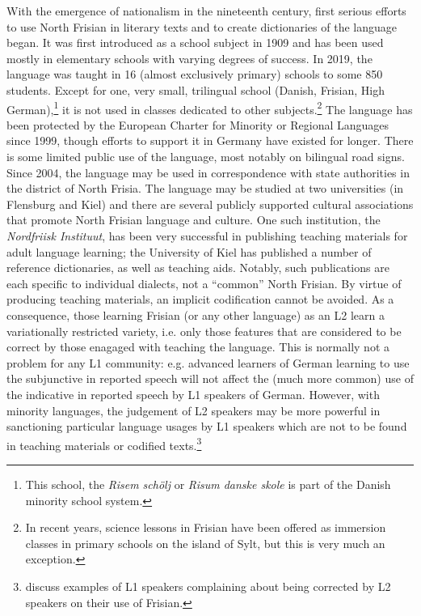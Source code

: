 \documentclass[output=paper]{langsci/langscibook}
\begin{document}
With the emergence of nationalism in the nineteenth century, first serious efforts to use North Frisian in literary texts and to create dictionaries of the language began. It was first introduced as a school subject in 1909 and has been used mostly in elementary schools with varying degrees of success. In 2019, the language was taught in 16 (almost exclusively primary) schools to some 850 students. Except for one, very small, trilingual school (Danish, Frisian, High German),\footnote{This school, the \textit{Risem schölj} or \textit{Risum danske skole} is part of the Danish minority school system.} it is not used in classes dedicated to other subjects.\footnote{In recent years, science lessons in Frisian have been offered as immersion classes in primary schools on the island of Sylt, but this is very much an exception.} The language has been protected by the European Charter for Minority or Regional Languages since 1999, though efforts to support it in Germany have existed for longer. There is some limited public use of the language, most notably on bilingual road signs. Since 2004, the language may be used in correspondence with state authorities in the district of North Frisia. The language may be studied at two universities (in Flensburg and Kiel) and there are several publicly supported cultural associations that promote North Frisian language and culture. One such institution, the \textit{Nordfriisk Instituut}, has been very successful in publishing teaching materials for adult language learning; the University of Kiel has published a number of reference dictionaries, as well as teaching aids. Notably, such publications are each specific to individual dialects, not a “common” North Frisian. By virtue of producing teaching materials, an implicit codification cannot be avoided. As a consequence, those learning Frisian (or any other language) as an L2 learn a variationally restricted variety, i.e. only those features that are considered to be correct by those enagaged with teaching the language. This is normally not a problem for any L1 community: e.g. advanced learners of German learning to use the subjunctive in reported speech will not affect the (much more common) use of the indicative in reported speech by L1 speakers of German. However, with minority languages, the judgement of L2 speakers may be more powerful in sanctioning particular language usages by L1 speakers which are not to be found in teaching materials or codified texts.\footnote{\citet{AdmiraalEtAl2019} discuss examples of L1 speakers complaining about being corrected by L2 speakers on their use of Frisian.}
\end{document}
